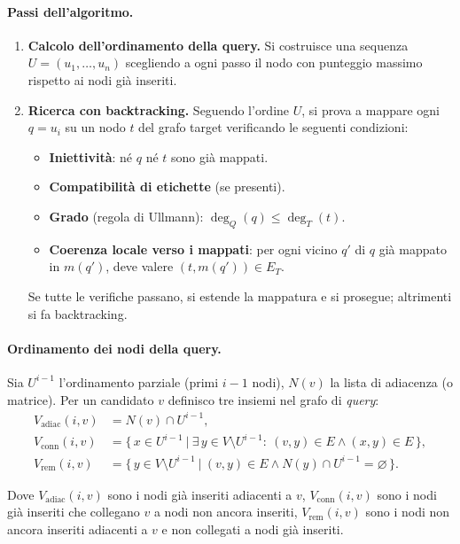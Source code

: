 \paragraph{Passi dell'algoritmo.}
\begin{enumerate}
  \item \textbf{Calcolo dell'ordinamento della query.}
        Si costruisce una sequenza $U = (u_1,\ldots,u_n)$ scegliendo a ogni passo il nodo con punteggio massimo rispetto ai nodi già inseriti.
  \item \textbf{Ricerca con backtracking.}
        Seguendo l'ordine $U$, si prova a mappare ogni $q = u_i$ su un nodo $t$ del grafo target verificando le seguenti condizioni:
        \begin{itemize}
           \item \textbf{Iniettività}: né $q$ né $t$ sono già mappati.
           \item \textbf{Compatibilità di etichette} (se presenti).
           \item \textbf{Grado} (regola di Ullmann): $\deg_Q(q)\le \deg_T(t)$.
           \item \textbf{Coerenza locale verso i mappati}: per ogni vicino $q'$ di $q$ già mappato in $m(q')$, deve valere $(t,m(q'))\in E_T$.
        \end{itemize}
        Se tutte le verifiche passano, si estende la mappatura e si prosegue; altrimenti si fa backtracking.
\end{enumerate}

\paragraph{Ordinamento dei nodi della query.}
Sia $U^{i-1}$ l'ordinamento parziale (primi $i\!-\!1$ nodi), $N(v)$ la lista di adiacenza (o matrice). 
Per un candidato $v$ definisco tre insiemi nel grafo di \emph{query}:
\begin{align*}
V_{\text{adiac}}(i,v) &= N(v)\cap U^{i-1},\\[2pt]
V_{\text{conn}}(i,v) &= \big\{\, x\in U^{i-1}\ \big|\ \exists\, y\in V\!\setminus\!U^{i-1}:\ (v,y)\in E \land (x,y)\in E \,\big\},\\[2pt]
V_{\text{rem}}(i,v)  &= \big\{\, y\in V\!\setminus\!U^{i-1}\ \big|\ (v,y)\in E \land N(y)\cap U^{i-1}=\varnothing \,\big\}.
\end{align*}

\noindent
Dove $V_{\text{adiac}}(i,v)$ sono i nodi già inseriti adiacenti a $v$,
$V_{\text{conn}}(i,v)$ sono i nodi già inseriti che collegano $v$ a nodi non ancora inseriti, $V_{\text{rem}}(i,v)$ sono i nodi non ancora inseriti adiacenti a $v$ e non collegati a nodi già inseriti.

